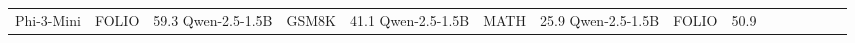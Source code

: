 \begin{tabular}{lllllllllllllll}
Phi-3-Mini & FOLIO & 59.3%
Qwen-2.5-1.5B & GSM8K & 41.1%
Qwen-2.5-1.5B & MATH & 25.9%
Qwen-2.5-1.5B & FOLIO & 50.9%
\bottomrule
\end{tabular}
